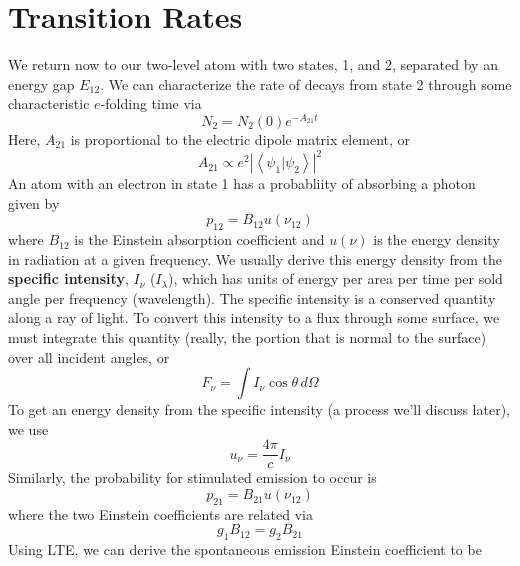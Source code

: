 \documentclass[10pt]{article}
\numberwithin{equation}{section}
\newcommand{\norm}[1]{\left\lvert#1\right\rvert}
\newcommand{\avg}[1]{\left\langle#1\right\rangle}
\begin{document}
\section{Transition Rates} %
\label{sec:transition_rates}
We return now to our two-level atom with two states, 1, and 2, separated by an
energy gap $E_{12}$. We can characterize the rate of decays from state 2
through some characteristic $e$-folding time via
\begin{equation}
  \label{eq:trans:1} N_2 = N_2(0)e^{-A_{21}t}
\end{equation}
Here, $A_{21}$ is proportional to the electric dipole matrix element, or
\begin{equation}
  \label{eq:trans:2} A_{21}\propto e^2\norm{\avg{\psi_1\vert\psi_2}}^2
\end{equation}
An atom with an electron in state 1 has a probabliity of absorbing a photon
given by
\begin{equation}
  \label{eq:trans:3} p_{12} = B_{12} u(\nu_{12})
\end{equation}
where $B_{12}$ is the Einstein absorption coefficient and $u(\nu)$ is the
energy density in radiation at a given frequency. We usually derive this energy
density from the \textbf{specific intensity}, $I_\nu$ ($I_\lambda$), which has
units of energy per area per time per sold angle per frequency (wavelength).
The specific intensity is a conserved quantity along a ray of light. To convert
this intensity to a flux through some surface, we must integrate this quantity
(really, the portion that is normal to the surface) over all incident angles, or
\begin{equation}
  \label{eq:trans:4} F_\nu = \int I_\nu\cos\theta\,d\Omega
\end{equation}
To get an energy density from the specific intensity (a process we'll discuss
later), we use
\begin{equation}
  \label{eq:trans:5} u_\nu = \frac{4\pi}{c}I_\nu
\end{equation}
Similarly, the probability for stimulated emission to occur is
\begin{equation}
  \label{eq:trans:6} p_{21} = B_{21}u(\nu_{12})
\end{equation}
where the two Einstein coefficients are related via
\begin{equation}
  \label{eq:trans:7} g_1 B_{12} = g_2B_{21}
\end{equation}
Using LTE, we can derive the spontaneous emission Einstein coefficient to be
\end{document}
